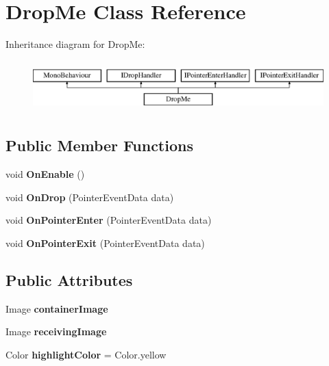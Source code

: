 \hypertarget{class_drop_me}{}\section{Drop\+Me Class Reference}
\label{class_drop_me}
Inheritance diagram for Drop\+Me\+:\begin{figure}[H]
\begin{center}
\leavevmode
\includegraphics[height=2.000000cm]{class_drop_me}
\end{center}
\end{figure}
\subsection*{Public Member Functions}
\begin{DoxyCompactItemize}
\item 
\mbox{\label{class_drop_me_ac888869fb4ff5d6060bd96c0bf551a8b}} 
void {\bfseries On\+Enable} ()
\item 
\mbox{\label{class_drop_me_a1f7fa5671969303bea59c0d6ada4f023}} 
void {\bfseries On\+Drop} (Pointer\+Event\+Data data)
\item 
\mbox{\label{class_drop_me_acd4f620ac92a63d6c16027322b67c6e2}} 
void {\bfseries On\+Pointer\+Enter} (Pointer\+Event\+Data data)
\item 
\mbox{\label{class_drop_me_aad11bcd7bc71598ae558b791f8f12102}} 
void {\bfseries On\+Pointer\+Exit} (Pointer\+Event\+Data data)
\end{DoxyCompactItemize}
\subsection*{Public Attributes}
\begin{DoxyCompactItemize}
\item 
\mbox{\label{class_drop_me_acc135526f30abeb985b196b68f449411}} 
Image {\bfseries container\+Image}
\item 
\mbox{\label{class_drop_me_a9a9812f35bba45279d3aaa6163991279}} 
Image {\bfseries receiving\+Image}
\item 
\mbox{\label{class_drop_me_a897922085dbedca58c54d22c5dd19cac}} 
Color {\bfseries highlight\+Color} = Color.\+yellow
\end{DoxyCompactItemize}
